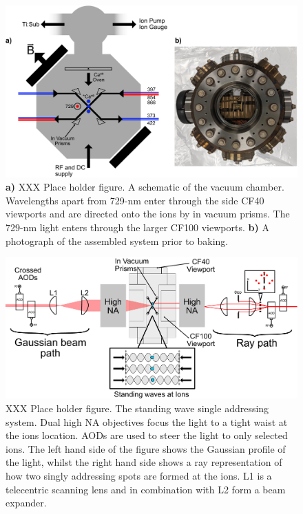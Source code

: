 \begin{figure}
  \begin{center}
   \noindent\includegraphics[width=0.9\linewidth]{figures/pdf_figure/vacuum_can-crop.pdf}
  \end{center}
  \caption{
    \textbf{a)} XXX Place holder figure. A schematic of the vacuum chamber.
    Wavelengths apart from 729-nm enter through the side CF40 viewports and are
    directed onto the ions by in vacuum prisms. The 729-nm light enters through
    the larger CF100 viewports.  \textbf{b)} A photograph of the assembled
    system prior to baking.
  }
  \label{fig:can}
\end{figure}


\begin{figure}
  \begin{center}
   \noindent\includegraphics[width=\linewidth]{figures/pdf_figure/vac_can_AOD_small.pdf}
  \end{center}
  \caption{XXX Place holder figure. The standing wave single addressing system. Dual high NA
    objectives focus the light to a tight waist at the ions
    location. AODs are used to steer the light to only selected
    ions. The left hand side of the figure shows the Gaussian profile
    of the light, whilst the right hand side shows a ray
    representation of how two singly addressing spots are formed at
    the ions. L1 is a telecentric scanning lens and in combination
    with L2 form a beam expander.}
  \label{fig:AOD}
\end{figure}

